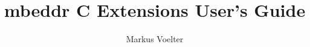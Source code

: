 \documentclass{llncs}
\title{mbeddr C Extensions User's Guide}
\author{Markus Voelter}
\institute{independent/itemis}
\begin{document}
\maketitle

\begin{abstract}
 
\end{abstract} 



 
%
\end{document}
